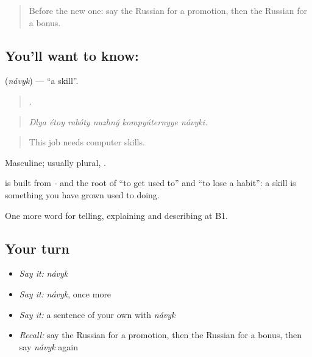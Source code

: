 \label{lesson:RU-C362-navyk}



\begin{quote}
Before the new one: say the Russian for a promotion, then the Russian for a bonus.
\end{quote}

\subsection*{You'll want to know: }
\textbf{} (\emph{návyk}) — \textquotedblleft{}a skill\textquotedblright{}.

\begin{quote}
     .
\end{quote}

\begin{quote}
\emph{Dlya étoy rabóty nuzhný kompyúternyye návyki.}
\end{quote}

\begin{quote}
This job needs computer skills.
\end{quote}

Masculine; usually plural, \emph{}.

\begin{cousinweb}
\textbf{} is built from \emph{-} and the root of \emph{} \textquotedblleft{}to get used to\textquotedblright{} and \emph{} \textquotedblleft{}to lose a habit\textquotedblright{}: a skill is something you have grown used to doing.
\end{cousinweb}

\begin{grammarlens}[title={What you've built}]
One more word for telling, explaining and describing at B1.
\end{grammarlens}

\subsection*{Your turn}
\begin{itemize}
\raggedright
  \item \emph{Say it:} \emph{návyk}
  \item \emph{Say it:} \emph{návyk}, once more
  \item \emph{Say it:} a sentence of your own with \emph{návyk}
  \item \emph{Recall:} say the Russian for a promotion, then the Russian for a bonus, then say \emph{návyk} again
\end{itemize}


